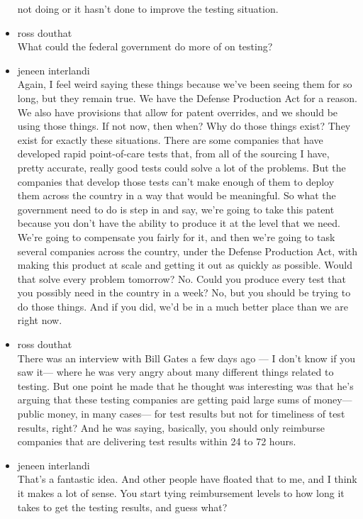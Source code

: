 \begin{itemize}
  not doing or it hasn't done to improve the testing situation.
\item
  ross douthat\\
  What could the federal government do more of on testing?
\item
  jeneen interlandi\\
  Again, I feel weird saying these things because we've been seeing them
  for so long, but they remain true. We have the Defense Production Act
  for a reason. We also have provisions that allow for patent overrides,
  and we should be using those things. If not now, then when? Why do
  those things exist? They exist for exactly these situations. There are
  some companies that have developed rapid point-of-care tests that,
  from all of the sourcing I have, pretty accurate, really good tests
  could solve a lot of the problems. But the companies that develop
  those tests can't make enough of them to deploy them across the
  country in a way that would be meaningful. So what the government need
  to do is step in and say, we're going to take this patent because you
  don't have the ability to produce it at the level that we need. We're
  going to compensate you fairly for it, and then we're going to task
  several companies across the country, under the Defense Production
  Act, with making this product at scale and getting it out as quickly
  as possible. Would that solve every problem tomorrow? No. Could you
  produce every test that you possibly need in the country in a week?
  No, but you should be trying to do those things. And if you did, we'd
  be in a much better place than we are right now.
\item
  ross douthat\\
  There was an interview with Bill Gates a few days ago --- I don't know
  if you saw it--- where he was very angry about many different things
  related to testing. But one point he made that he thought was
  interesting was that he's arguing that these testing companies are
  getting paid large sums of money--- public money, in many cases--- for
  test results but not for timeliness of test results, right? And he was
  saying, basically, you should only reimburse companies that are
  delivering test results within 24 to 72 hours.
\item
  jeneen interlandi\\
  That's a fantastic idea. And other people have floated that to me, and
  I think it makes a lot of sense. You start tying reimbursement levels
  to how long it takes to get the testing results, and guess what?

\end{itemize}
